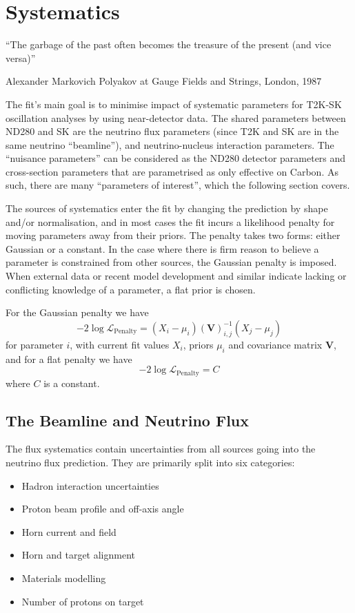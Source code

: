 \section{Systematics}
\label{sec:syst}

\epigraph{``The garbage of the past often becomes the treasure of the present (and vice versa)''}{Alexander Markovich Polyakov at Gauge Fields and Strings, London, 1987}

The fit's main goal is to minimise impact of systematic parameters for T2K-SK oscillation analyses by using near-detector data. The shared parameters between ND280 and SK are the neutrino flux parameters (since T2K and SK are in the same neutrino ``beamline''), and neutrino-nucleus interaction parameters. The ``nuisance parameters'' can be considered as the ND280 detector parameters and cross-section parameters that are parametrised as only effective on Carbon. As such, there are many ``parameters of interest'', which the following section covers.

The sources of systematics enter the fit by changing the prediction by shape and/or normalisation, and in most cases the fit incurs a likelihood penalty for moving parameters away from their priors. The penalty takes two forms: either Gaussian or a constant. In the case where there is firm reason to believe a parameter is constrained from other sources, the Gaussian penalty is imposed. When external data or recent model development and similar indicate lacking or conflicting knowledge of a parameter, a flat prior is chosen.

For the Gaussian penalty we have
\begin{equation}
	-2\log\mathcal{L}_\text{Penalty} = (X_i-\mu_i) \left(\mathbf{V}\right)^{-1}_{i,j} (X_j-\mu_j)
\end{equation}
for parameter $i$, with current fit values $X_i$, priors $\mu_i$ and covariance matrix $\mathbf{V}$, and for a flat penalty we have
\begin{equation}
	-2\log\mathcal{L}_\text{Penalty} = C
\end{equation}
where $C$ is a constant.

\subsection{The Beamline and Neutrino Flux}
\label{subsec:syst_flux}
The flux systematics contain uncertainties from all sources going into the neutrino flux prediction. They are primarily split into six categories:
\begin{itemize}
	\item Hadron interaction uncertainties
	\item Proton beam profile and off-axis angle
	\item Horn current and field
	\item Horn and target alignment
	\item Materials modelling
	\item Number of protons on target
\end{itemize}

